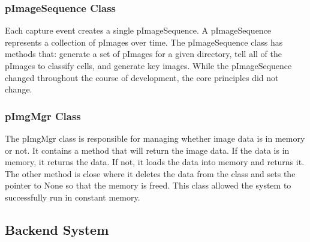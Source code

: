 \documentclass[]{article}
\begin{document}
			\subsubsection{pImageSequence Class}
				Each capture event creates a single pImageSequence. A pImageSequence represents a collection of pImages over time. The pImageSequence class has methods that: generate a set of pImages for a given directory, tell all of the pImages to classify cells, and generate key images. While the pImageSequence changed throughout the course of development, the core principles did not change.
				
			\subsubsection{pImgMgr Class}
				The pImgMgr class is responsible for managing whether image data is in memory or not. It contains a method that will return the image data. If the data is in memory, it returns the data. If not, it loads the data into memory and returns it. The other method is close where it deletes the data from the class and sets the pointer to None so that the memory is freed. This class allowed the system to successfully run in constant memory. 
		
		\subsection{Backend System}

	
	\newpage
	
	
\end{document}
